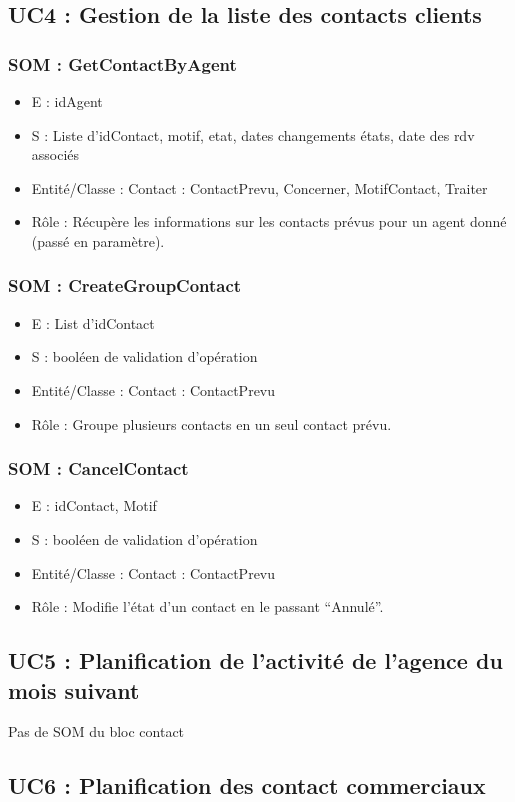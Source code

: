 \subsection{UC4 : Gestion de la liste des contacts clients}
\subsubsection{SOM : GetContactByAgent}
\begin{itemize}
\item E : idAgent
\item S : Liste d’idContact, motif, etat, dates changements états, date des rdv associés
\item Entité/Classe : Contact : ContactPrevu, Concerner, MotifContact, Traiter
\item Rôle : Récupère les informations sur les contacts prévus pour un agent donné
(passé en paramètre).
\end{itemize}
\subsubsection{SOM : CreateGroupContact}
\begin{itemize}
\item E : List d’idContact
\item S : booléen de validation d’opération
\item Entité/Classe : Contact : ContactPrevu
\item Rôle : Groupe plusieurs contacts en un seul contact prévu.
\end{itemize}
\subsubsection{SOM : CancelContact}
\begin{itemize}
\item E : idContact, Motif
\item S : booléen de validation d’opération
\item Entité/Classe : Contact : ContactPrevu
\item Rôle : Modifie l’état d’un contact en le passant “Annulé”.
\end{itemize}
\subsection{UC5 : Planification de l’activité de l’agence du mois suivant}
Pas de SOM du bloc contact
\subsection{UC6 : Planification des contact commerciaux}
